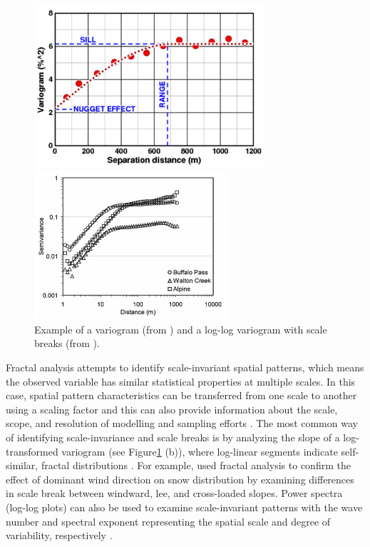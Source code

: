 \documentclass[12pt]{article}
\begin{document}
\begin{figure}
\begin{minipage}[c][8cm][t]{.58\textwidth}
        \vspace*{\fill}
  \centering
  \includegraphics[height=6cm]{variogram.png}
\end{minipage}%
\begin{minipage}[c][8cm][t]{.38\textwidth}
        \vspace*{\fill} 
          \centering
         \includegraphics[height=5.5cm]{loglogvario.png}
  \end{minipage}%

\caption{Example of a variogram (from \cite{Srivastava2013}) and a log-log variogram with scale breaks (from \cite{Deems2006a}).}
\label{variogram}
\end{figure}

Fractal analysis attempts to identify scale-invariant spatial patterns, which means the observed variable has similar statistical properties at multiple scales. In this case, spatial pattern characteristics can be transferred from one scale to another using a scaling factor and this can also provide information about the scale, scope, and resolution of modelling and sampling efforts \citep{Deems2006a}. The most common way of identifying scale-invariance and scale breaks is by analyzing the slope of a log-transformed variogram (see Figure\ref{variogram} (b)), where log-linear segments indicate self-similar, fractal distributions \citep{Deems2006a}. For example, \cite{Schirmer2011a} used fractal analysis to confirm the effect of dominant wind direction on snow distribution by examining differences in scale break between windward, lee, and cross-loaded slopes. Power spectra (log-log plots) can also be used to examine scale-invariant patterns with the wave number and spectral exponent representing the spatial scale and degree of variability, respectively \citep{Trujillo2007, Trujillo2009}.
\end{document}
